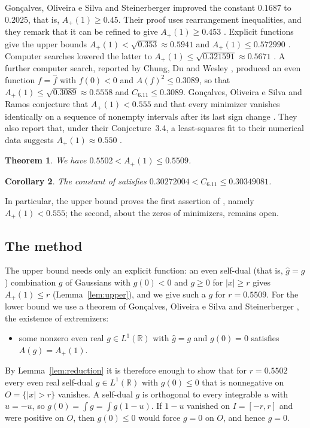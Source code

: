 \documentclass[11pt]{amsart}
\newtheorem{theorem}{Theorem}[section]
\newtheorem{corollary}[theorem]{Corollary}
\theoremstyle{definition}
\theoremstyle{remark}
\numberwithin{equation}{section}
\newcommand{\R}{\mathbb{R}}
\newcommand{\ft}[1]{\widehat{#1}}
\newcommand{\Ap}{A_+(1)}
\newcommand{\Csix}{C_{6.11}}
\newcommand{\rdec}{0.5502}
\newcommand{\Cdec}{0.30272004}
\newcommand{\rPdec}{0.5509}
\newcommand{\CPdec}{0.30349081}
\begin{document}
Gon\c{c}alves, Oliveira e Silva and Steinerberger \cite[Theorem~2]{GOS17} improved the constant $0.1687$ to $0.2025$, that is, $\Ap\ge0.45$. Their proof uses rearrangement inequalities, and they remark that it can be refined to give $\Ap\ge0.453$ \cite[Section~4]{GOS17}. Explicit functions give the upper bounds $\Ap<\sqrt{0.353}\approx0.5941$ \cite[Theorem~2]{GOS17} and $\Ap\le0.572990$ \cite[Table~4.1]{CG19}. Computer searches \cite{AE25,GGTW25} lowered the latter to $\Ap\le\sqrt{0.321591}\approx0.5671$ \cite[Table~3]{GGTW25}. A further computer search, reported by Chung, Du and Wesley \cite[Section~6.5]{CDW26}, produced an even function $f=\ft f$ with $f(0)<0$ and $A(f)^2\le0.3089$, so that $\Ap\le\sqrt{0.3089}\approx0.5558$ and $\Csix\le0.3089$. Gon\c{c}alves, Oliveira e Silva and Ramos conjecture that $\Ap<0.555$ and that every minimizer vanishes identically on a sequence of nonempty intervals after its last sign change \cite[Conjecture~1.7]{GOR23}. They also report that, under their Conjecture~3.4, a least-squares fit to their numerical data suggests $\Ap\approx0.550$ \cite[Section~6.1]{GOR23}.

\begin{theorem}\label{thm:main}
We have $\rdec<\Ap\le\rPdec$.
\end{theorem}

\begin{corollary}\label{cor:six}
The constant of \cite[Problem~6.11]{GGTW25} satisfies $\Cdec<\Csix\le\CPdec$.
\end{corollary}

In particular, the upper bound proves the first assertion of \cite[Conjecture~1.7]{GOR23}, namely $\Ap<0.555$; the second, about the zeros of minimizers, remains open.

\subsection*{The method}
The upper bound needs only an explicit function: an even self-dual (that is, $\ft g=g$) combination $g$ of Gaussians with $g(0)<0$ and $g\ge0$ for $|x|\ge r$ gives $\Ap\le r$ (Lemma~\ref{lem:upper}), and we give such a $g$ for $r=\rPdec$. For the lower bound we use a theorem of Gon\c{c}alves, Oliveira e Silva and Steinerberger \cite[Theorem~3]{GOS17}, the existence of extremizers:
\begin{itemize}[leftmargin=3em]
\item[(E)] some nonzero even real $g\in L^1(\R)$ with $\ft g=g$ and $g(0)=0$ satisfies $A(g)=\Ap$.
\end{itemize}
 By Lemma~\ref{lem:reduction} it is therefore enough to show that for $r=\rdec$ every even real self-dual $g\in L^1(\R)$ with $g(0)\le0$ that is nonnegative on $O=\{|x|>r\}$ vanishes. A self-dual $g$ is orthogonal to every integrable $u$ with $\ft u=-u$, so $g(0)=\int g=\int g(1-u)$. If $1-u$ vanished on $I=[-r,r]$ and were positive on $O$, then $g(0)\le0$ would force $g=0$ on $O$, and hence $g=0$.
\end{document}
